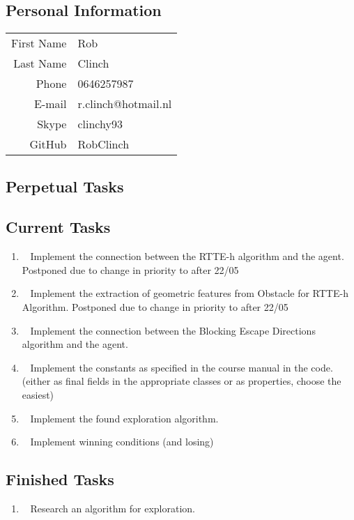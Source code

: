 \subsection{Personal Information}
\begin{table}[h!]
	\begin{tabular}{rl}
		First Name 	& Rob\\
		Last Name	& Clinch\\
		Phone		& 0646257987\\
		E-mail		& r.clinch@hotmail.nl\\
		Skype		& clinchy93\\
		GitHub		& RobClinch
	\end{tabular}
\end{table}

\subsection{Perpetual Tasks}

\subsection{Current Tasks}
\begin{enumerate}
	\item~
		Implement the connection between the RTTE-h algorithm and the agent.
		\subitem Postponed due to change in priority to after 22/05
	\item~
		Implement the extraction of geometric features from Obstacle for RTTE-h Algorithm.
		\subitem Postponed due to change in priority to after 22/05
	\item~
		Implement the connection between the Blocking Escape Directions algorithm and the agent.
	\item~
		Implement the constants as specified in the course manual in the code. (either as final fields in the appropriate classes or as properties, choose the easiest)
	\item~
		Implement the found exploration algorithm.
	\item~
		Implement winning conditions (and losing)
\end{enumerate}

\subsection{Finished Tasks}
\begin{enumerate}
\item~
		Research an algorithm for exploration.
\end{enumerate}
